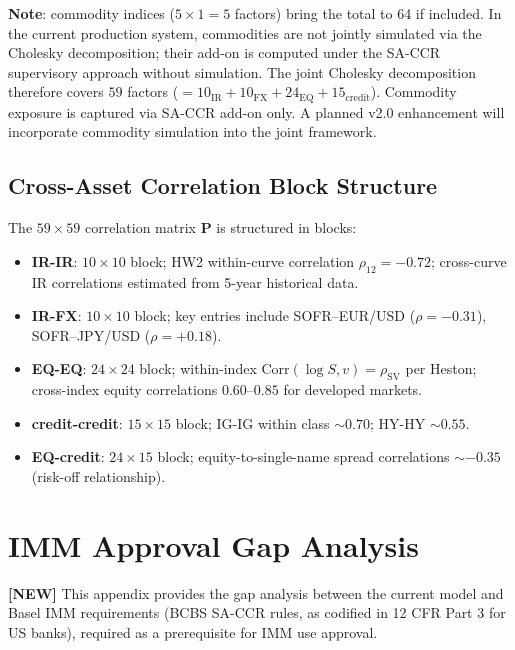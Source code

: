 \documentclass[11pt,a4paper]{article}
\begin{document}
\textbf{Note}: commodity indices ($5 \times 1 = 5$ factors) bring the total to 64
if included. In the current production system, commodities are not jointly
simulated via the Cholesky decomposition; their add-on is computed under the
SA-CCR supervisory approach without simulation. The joint Cholesky
decomposition therefore covers $59$ factors ($= 10_{\text{IR}} + 10_{\text{FX}}
+ 24_{\text{EQ}} + 15_{\text{credit}}$). Commodity exposure is captured
via SA-CCR add-on only. A planned v2.0 enhancement will incorporate commodity
simulation into the joint framework.

\subsection*{Cross-Asset Correlation Block Structure}

The $59 \times 59$ correlation matrix $\mathbf{P}$ is structured in blocks:

\begin{itemize}[noitemsep]
  \item \textbf{IR-IR}: $10 \times 10$ block; HW2 within-curve correlation $\rho_{12} = -0.72$;
        cross-curve IR correlations estimated from 5-year historical data.
  \item \textbf{IR-FX}: $10 \times 10$ block; key entries include
        SOFR--EUR/USD ($\rho = -0.31$), SOFR--JPY/USD ($\rho = +0.18$).
  \item \textbf{EQ-EQ}: $24 \times 24$ block; within-index
        $\text{Corr}(\log S, v) = \rho_{\text{SV}}$ per Heston; cross-index
        equity correlations $0.60$--$0.85$ for developed markets.
  \item \textbf{credit-credit}: $15 \times 15$ block; IG-IG within
        class $\sim 0.70$; HY-HY $\sim 0.55$.
  \item \textbf{EQ-credit}: $24 \times 15$ block; equity-to-single-name
        spread correlations $\sim -0.35$ (risk-off relationship).
\end{itemize}

\section{IMM Approval Gap Analysis}
\label{app:imm_gap}

\textbf{[NEW]} This appendix provides the gap analysis between the current
model and Basel IMM requirements (BCBS SA-CCR rules, as codified in
12 CFR Part 3 for US banks), required as a prerequisite for IMM use approval.
\end{document}
